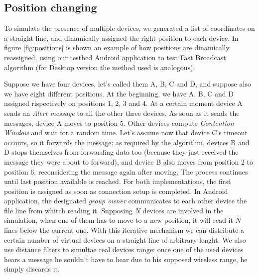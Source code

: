 \subsection{Position changing}
\label{sec:position_change}

To simulate the presence of multiple devices, we generated a list of coordinates on a straight line, and dinamically assigned the right position to each device. In figure \ref{fig:positions} is shown an example of how positions are dinamically reassigned, using our testbed Android application to test Fast Broadcast algorithm (for Desktop version the method used is analogous).

Suppose we have four devices, let's called them A, B, C and D, and suppose also we have eight different positions. At the beginning, we have A, B, C and D assigned rispectively on positions 1, 2, 3 and 4. At a certain moment device A sends an \emph{Alert message} to all the other three devices. As soon as it sends the messages, device A moves to position 5. Other devices compute \textit{Contention Window} and wait for a random time. Let's assume now that device C's timeout occours, so it forwards the message: as required by the algorithm, devices B and D stops themselves from forwarding data too (because they just received the message they were about to forward), and device B also moves from position 2 to position 6, reconsidering the message again after moving. The process continues until last position available is reached.
For both implementations, the first position is assigned as soon as connection setup is completed. In Android application, the designated \textit{group owner} communicates to each other device the file line from whitch reading it. Supposing $N$ devices are involved in the simulation, when one of them has to move to a new position, it will read it $N$ lines below the current one.
With this iterative mechanism we can distribute a certain number of virtual devices on a straight line of arbitrary lenght. 
We also use distance filters to simultae real devices range: once one of the used devices hears a message he souldn't have to hear due to his supposed wireless range, he simply discards it.

